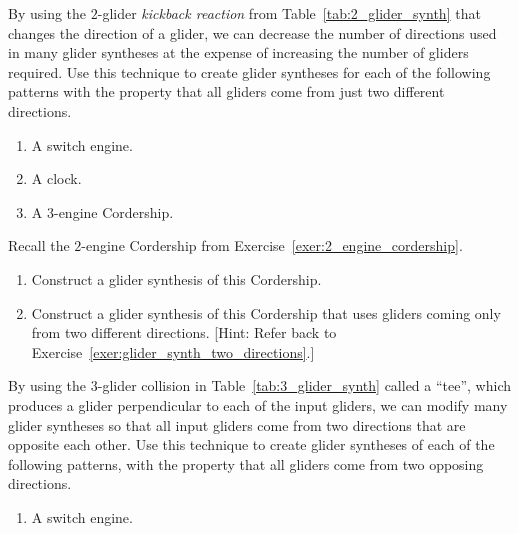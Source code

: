 \begin{multicols}{2}
\begin{problem}\label{exer:glider_synth_two_directions}
	By using the $2$-glider \emph{kickback reaction} from Table~\ref{tab:2_glider_synth} that changes the direction of a glider, we can decrease the number of directions used in many glider syntheses at the expense of increasing the number of gliders required. Use this technique to create glider syntheses for each of the following patterns with the property that all gliders come from just two different directions.
	\begin{enumerate}[label=(\alph*)]
		\item A switch engine.
		
		\item A clock.
		
		\item A $3$-engine Cordership.
	\end{enumerate}
\end{problem}


\mfilbreak


\begin{problem}\label{exer:2_engine_cordership_synthesis}
	Recall the $2$-engine Cordership from Exercise~\ref{exer:2_engine_cordership}.\smallskip
	
	\begin{enumerate}[label=(\alph*)]
		\item Construct a glider synthesis of this Cordership.
		
		\item Construct a glider synthesis of this Cordership that uses gliders coming only from two different directions. [Hint: Refer back to Exercise~\ref{exer:glider_synth_two_directions}.]
	\end{enumerate}
\end{problem}


\mfilbreak


\begin{problem}\label{exer:glider_synth_tee}
	By using the $3$-glider collision in Table~\ref{tab:3_glider_synth} called a ``tee'', which produces a glider perpendicular to each of the input gliders, we can modify many glider syntheses so that all input gliders come from two directions that are opposite each other. Use this technique to create glider syntheses of each of the following patterns, with the property that all gliders come from two opposing directions.
	\begin{enumerate}[label=(\alph*)]
		\item A switch engine.
		

\end{enumerate}
\end{problem}
\end{multicols}
